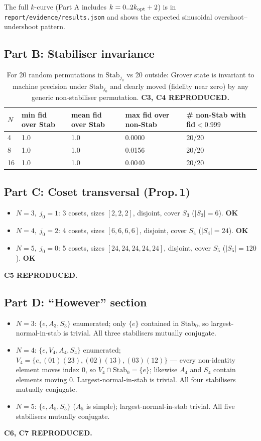 \documentclass[11pt]{article}
\begin{document}
The full $k$-curve (Part A includes $k=0..2k_{\rm opt}+2$) is in
\texttt{report/evidence/results.json} and shows the expected sinusoidal
overshoot--undershoot pattern.

\subsection{Part B: Stabiliser invariance}

\begin{table}[h!]
\centering
\begin{tabular}{@{}lllll@{}}
\toprule
$N$ & min fid over Stab & mean fid over Stab & max fid over non-Stab & \# non-Stab with fid$<0.999$ \\
\midrule
4  & 1.0 & 1.0 & 0.0000 & 20/20 \\
8  & 1.0 & 1.0 & 0.0156 & 20/20 \\
16 & 1.0 & 1.0 & 0.0040 & 20/20 \\
\bottomrule
\end{tabular}
\caption{For 20 random permutations in $\mathrm{Stab}_{j_0}$ vs 20 outside:
Grover state is invariant to machine precision under $\mathrm{Stab}_{j_0}$
and clearly moved (fidelity near zero) by any generic non-stabiliser
permutation.  \textbf{C3, C4 REPRODUCED.}}
\end{table}

\subsection{Part C: Coset transversal (Prop.\,1)}
\begin{itemize}
\item $N=3,\;j_0=1$: 3 cosets, sizes $[2,2,2]$, disjoint, cover $S_3$
      ($|S_3|=6$). \textbf{OK}
\item $N=4,\;j_0=2$: 4 cosets, sizes $[6,6,6,6]$, disjoint, cover $S_4$
      ($|S_4|=24$). \textbf{OK}
\item $N=5,\;j_0=0$: 5 cosets, sizes $[24,24,24,24,24]$, disjoint, cover
      $S_5$ ($|S_5|=120$). \textbf{OK}
\end{itemize}
\textbf{C5 REPRODUCED.}

\subsection{Part D: ``However'' section}
\begin{itemize}
\item $N=3$: $\{e,A_3,S_3\}$ enumerated; only $\{e\}$ contained in
      $\mathrm{Stab}_0$, so largest-normal-in-stab is trivial.
      All three stabilisers mutually conjugate.
\item $N=4$: $\{e,V_4,A_4,S_4\}$ enumerated;
      $V_4=\{e,(01)(23),(02)(13),(03)(12)\}$ --- every non-identity
      element moves index $0$, so $V_4\cap\mathrm{Stab}_0=\{e\}$; likewise
      $A_4$ and $S_4$ contain elements moving $0$.  Largest-normal-in-stab
      is trivial.  All four stabilisers mutually conjugate.
\item $N=5$: $\{e,A_5,S_5\}$ ($A_5$ is simple); largest-normal-in-stab
      trivial.  All five stabilisers mutually conjugate.
\end{itemize}
\textbf{C6, C7 REPRODUCED.}
\end{document}
